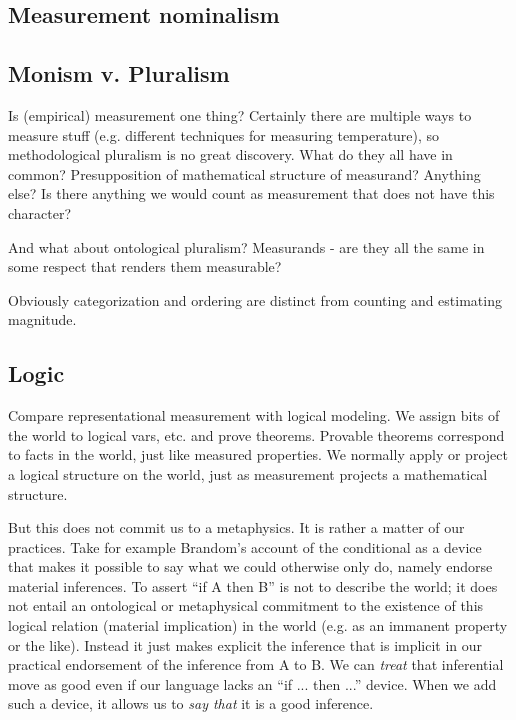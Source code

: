 \documentclass[11pt,twoside]{article}
\begin{document}
\subsection{Measurement nominalism}

\subsection{Monism v. Pluralism}

Is (empirical) measurement one thing?  Certainly there are multiple
ways to measure stuff (e.g. different techniques for measuring
temperature), so methodological pluralism is no great discovery.  What
do they all have in common?  Presupposition of mathematical structure
of measurand?  Anything else?  Is there anything we would count as
measurement that does not have this character?

And what about ontological pluralism?  Measurands - are they all the
same in some respect that renders them measurable?

Obviously categorization and ordering are distinct from counting and
estimating magnitude.

\subsection{Logic}

Compare representational measurement with logical modeling.  We assign
bits of the world to logical vars, etc. and prove theorems.  Provable
theorems correspond to facts in the world, just like measured
properties.  We normally apply or project a logical structure on the
world, just as measurement projects a mathematical structure.

But this does not commit us to a metaphysics.  It is rather a matter
of our practices.  Take for example Brandom's account of the
conditional as a device that makes it possible to say what we could
otherwise only do, namely endorse material inferences.  To assert ``if
A then B'' is not to describe the world; it does not entail an
ontological or metaphysical commitment to the existence of this
logical relation (material implication) in the world (e.g. as an
immanent property or the like).  Instead it just makes explicit the
inference that is implicit in our practical endorsement of the
inference from A to B.  We can \textit{treat} that inferential move as
good even if our language lacks an ``if ... then ...'' device.  When
we add such a device, it allows us to \textit{say that} it is a good
inference.
\end{document}
